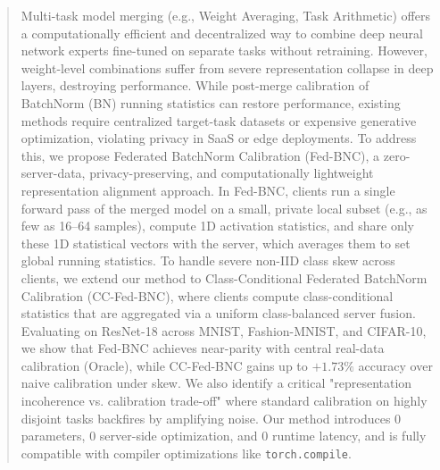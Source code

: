 \documentclass{article}
\theoremstyle{plain}
\theoremstyle{definition}
\theoremstyle{remark}
\begin{document}

\printAffiliationsAndNotice{}

\begin{abstract}
  Multi-task model merging (e.g., Weight Averaging, Task Arithmetic) offers a computationally efficient and decentralized way to combine deep neural network experts fine-tuned on separate tasks without retraining. However, weight-level combinations suffer from severe representation collapse in deep layers, destroying performance. While post-merge calibration of BatchNorm (BN) running statistics can restore performance, existing methods require centralized target-task datasets or expensive generative optimization, violating privacy in SaaS or edge deployments. To address this, we propose Federated BatchNorm Calibration (Fed-BNC), a zero-server-data, privacy-preserving, and computationally lightweight representation alignment approach. In Fed-BNC, clients run a single forward pass of the merged model on a small, private local subset (e.g., as few as 16--64 samples), compute 1D activation statistics, and share only these 1D statistical vectors with the server, which averages them to set global running statistics. To handle severe non-IID class skew across clients, we extend our method to Class-Conditional Federated BatchNorm Calibration (CC-Fed-BNC), where clients compute class-conditional statistics that are aggregated via a uniform class-balanced server fusion. Evaluating on ResNet-18 across MNIST, Fashion-MNIST, and CIFAR-10, we show that Fed-BNC achieves near-parity with central real-data calibration (Oracle), while CC-Fed-BNC gains up to $+1.73\%$ accuracy over naive calibration under skew. We also identify a critical "representation incoherence vs. calibration trade-off" where standard calibration on highly disjoint tasks backfires by amplifying noise. Our method introduces 0 parameters, 0 server-side optimization, and 0 runtime latency, and is fully compatible with compiler optimizations like \texttt{torch.compile}.
\end{abstract}
\end{document}
